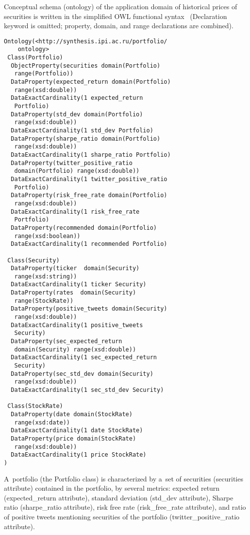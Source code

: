 \begin{multicols}{2}
{  \noindent
  Conceptual schema (ontology) of the application domain of historical prices of
securities is written in the simplified OWL functional syntax~\cite{8-kal}
({\sf Declaration} keyword is omitted; {\sf property}, {\sf domain}, and {\sf range}
declarations are combined).
  \begin{verbatim}
Ontology(<http://synthesis.ipi.ac.ru/portfolio/
    ontology>
 Class(Portfolio)
  ObjectProperty(securities domain(Portfolio)
   range(Portfolio))
  DataProperty(expected_return domain(Portfolio)
   range(xsd:double))
  DataExactCardinality(1 expected_return
   Portfolio)
  DataProperty(std_dev domain(Portfolio)
   range(xsd:double))
  DataExactCardinality(1 std_dev Portfolio)
  DataProperty(sharpe_ratio domain(Portfolio)
   range(xsd:double))
  DataExactCardinality(1 sharpe_ratio Portfolio)
  DataProperty(twitter_positive_ratio
   domain(Portfolio) range(xsd:double))
  DataExactCardinality(1 twitter_positive_ratio
   Portfolio)
  DataProperty(risk_free_rate domain(Portfolio)
   range(xsd:double))
  DataExactCardinality(1 risk_free_rate
   Portfolio)
  DataProperty(recommended domain(Portfolio)
   range(xsd:boolean))
  DataExactCardinality(1 recommended Portfolio)

 Class(Security)
  DataProperty(ticker  domain(Security)
   range(xsd:string))
  DataExactCardinality(1 ticker Security)
  DataProperty(rates  domain(Security)
   range(StockRate))
  DataProperty(positive_tweets domain(Security)
   range(xsd:double))
  DataExactCardinality(1 positive_tweets
   Security)
  DataProperty(sec_expected_return
   domain(Security) range(xsd:double))
  DataExactCardinality(1 sec_expected_return
   Security)
  DataProperty(sec_std_dev domain(Security)
   range(xsd:double))
  DataExactCardinality(1 sec_std_dev Security)

 Class(StockRate)
  DataProperty(date domain(StockRate)
   range(xsd:date))
  DataExactCardinality(1 date StockRate)
  DataProperty(price domain(StockRate)
   range(xsd:double))
  DataExactCardinality(1 price StockRate)
)
  \end{verbatim}

  \vspace*{-6pt}

  A~portfolio (the {\sf Portfolio} class) is characterized by a~set of securities
({\sf securities} attribute) contained in the portfolio, by several metrics: expected
return ({\sf expected\_return} attribute), standard deviation ({\sf std\_dev}
attribute), Sharpe ratio ({\sf sharpe\_ratio attribute}), risk free rate
({\sf risk\_free\_rate} attribute), and
ratio of positive tweets mentioning securities of
the portfolio ({\sf twitter\_positive\_ratio} attribute).

}
\end{multicols}

